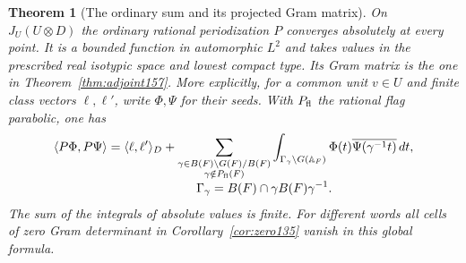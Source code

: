 \documentclass[a4paper,11pt]{article}
\newtheorem{theorem}[proposition]{Theorem}
\theoremstyle{definition}
\theoremstyle{remark}
\numberwithin{equation}{section}
\begin{document}
\begin{theorem}[The ordinary sum and its projected Gram matrix]
\label{thm:ordinary163}
On \(J_U(U\otimes D)\) the ordinary rational periodization \(P\)
converges absolutely at every point. It is a bounded function in
automorphic \(L^2\) and takes values in the prescribed real
isotypic space and lowest compact type. Its Gram matrix is the
one in Theorem~\ref{thm:adjoint157}. More explicitly, for a
common unit \(v\in U\) and finite class vectors \(\ell,\ell'\),
write \(\Phi,\Psi\) for their seeds. With \(P_{\rm fl}\) the
rational flag parabolic, one has
\begin{align}
 \langle P\Phi,P\Psi\rangle
 &=\langle\ell,\ell'\rangle_D+
     \sum_{\substack{\gamma\in B(F)\backslash G(F)/B(F)\\
                      \gamma\notin P_{\rm fl}(F)}}
        \int_{\Gamma_\gamma\backslash G(\mathbb A_F)}
          \Phi(t)\overline{\Psi(\gamma^{-1}t)}\,dt ,
       \label{eq:geom163}\\[-3pt]
 &\hspace{25mm}\Gamma_\gamma=B(F)\cap\gamma B(F)\gamma^{-1}.
 \notag
\end{align}
The sum of the integrals of absolute values is finite. For
different words all cells of zero Gram determinant in
Corollary~\ref{cor:zero135} vanish in this global formula.
\end{theorem}
\end{document}
